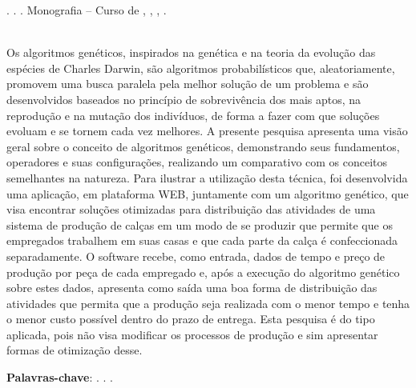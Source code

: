 
\begin{OnehalfSpacing} 

\noindent \imprimirAutorCitacaoMaiuscula. {\bfseries\imprimirtitulo}. {\imprimirdata}.  Monografia -- Curso de {\MakeUppercase\imprimircurso}, {\imprimirinstituicao}, {\imprimirlocal}, {\imprimirdata}.

\vspace{\onelineskip}
\vspace{\onelineskip}
\vspace{\onelineskip}
\vspace{\onelineskip}

\begin{resumo}
~\\
\noindent Os algoritmos genéticos, inspirados na genética e na teoria da evolução das espécies de Charles Darwin,
são algoritmos probabilísticos que, aleatoriamente, promovem uma busca paralela pela melhor solução de um problema e são 
desenvolvidos baseados no princípio de sobrevivência dos mais aptos, na reprodução e na mutação dos indivíduos, de forma a fazer com 
que soluções evoluam e se tornem cada vez melhores. A presente pesquisa apresenta uma visão geral sobre
o conceito de algoritmos genéticos, demonstrando seus fundamentos, operadores e suas configurações, realizando um comparativo 
com os conceitos semelhantes na natureza. Para ilustrar a utilização desta técnica, foi desenvolvida uma aplicação, 
em plataforma WEB, juntamente com um algoritmo genético, que visa encontrar soluções otimizadas para distribuição 
das atividades de uma sistema de produção de calças em um modo de se produzir que permite que os empregados trabalhem em suas 
casas e que cada parte da calça é confeccionada separadamente. O software recebe, como entrada, dados de tempo e preço
de produção por peça de cada empregado e, após a execução do algoritmo genético sobre estes dados, apresenta como saída uma 
boa forma de distribuição das atividades que permita que a produção seja realizada com o menor tempo e tenha o menor custo possível 
dentro do prazo de entrega. Esta pesquisa é do tipo aplicada, pois não visa modificar os processos de produção e sim apresentar 
formas de otimização desse.

\vspace{\onelineskip}
\vspace*{\fill}
\noindent \textbf{Palavras-chave}: \imprimirPalavraChaveUm. \imprimirPalavraChaveDois. \imprimirPalavraChaveTres.
\vspace{\onelineskip}
\end{resumo}

\end{OnehalfSpacing}
